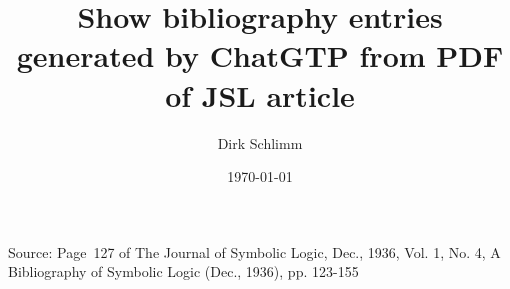 \documentclass[12pt]{article}
\title{Show bibliography entries generated by ChatGTP from PDF of JSL article}
\author{Dirk Schlimm}
\date{\today}
\begin{document}
\maketitle

Source: Page~127 of The Journal of Symbolic Logic, Dec., 1936, Vol. 1, No. 4, A Bibliography of Symbolic Logic (Dec., 1936), pp. 123-155

\nocite{*}




\end{document}
